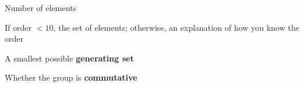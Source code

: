 \documentclass[../gatm_answers.tex]{subfiles}
\begin{document}
\begin{inner_problem}[start=1]
\item Number of elements
\end{inner_problem}

\begin{inner_problem}
\item If order $< 10$, the set of elements; otherwise, an explanation of how you know the order
\end{inner_problem}

\begin{inner_problem}
\item A smallest possible \textbf{generating set}
\end{inner_problem}

\begin{inner_problem}
\item Whether the group is \textbf{commutative}
\end{inner_problem}
\end{document}
